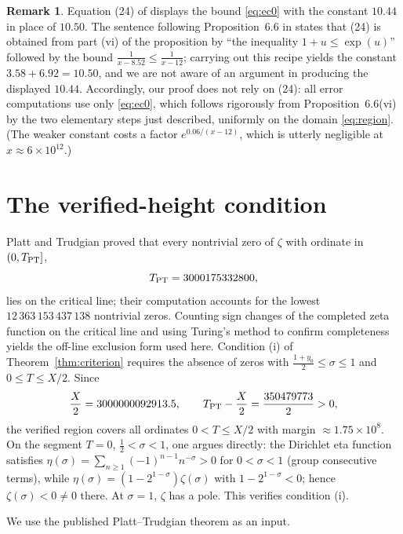 \documentclass[11pt]{article}
\theoremstyle{definition}
\newtheorem{remark}[theorem]{Remark}
\begin{document}
\begin{remark}\label{rem:1044}
Equation (24) of \cite{Polymath} displays the bound \eqref{eq:ec0}
with the constant $10.44$ in place of $10.50$. The sentence following
Proposition~6.6 in \cite{Polymath} states that (24) is obtained from
part (vi) of the proposition by ``the inequality $1+u\le\exp(u)$''
followed by the bound $\frac{1}{x-8.52}\le\frac{1}{x-12}$; carrying
out this recipe yields the constant $3.58+6.92=10.50$, and we are not
aware of an argument in \cite{Polymath} producing the displayed
$10.44$. Accordingly, our proof does not rely on (24): all error
computations use only
\eqref{eq:ec0}, which follows rigorously from Proposition~6.6(vi) by
the two elementary steps just described, uniformly on the domain
\eqref{eq:region}. (The weaker constant costs a factor
$e^{0.06/(x-12)}$, which is utterly negligible at
$x\approx6\times10^{12}$.)
\end{remark}

\section{The verified-height condition}\label{sec:hypi}

Platt and Trudgian \cite[Theorem~1]{PlattTrudgian} proved that every
nontrivial zero of $\zeta$ with ordinate in $(0,T_{\rm PT}]$,
\[
T_{\rm PT}=3000175332800,
\]
lies on the critical line; their computation accounts for the lowest
$12\,363\,153\,437\,138$ nontrivial zeros. Counting sign changes of the
completed zeta function on the critical line and using Turing's method to
confirm completeness yields the off-line exclusion form used here.
Condition (i) of
Theorem~\ref{thm:criterion} requires the absence of zeros with
$\frac{1+y_0}{2}\le\sigma\le1$ and $0\le T\le X/2$. Since
\[
\frac X2=3000000092913.5,
\qquad
T_{\rm PT}-\frac X2=\frac{350479773}{2}>0,
\]
the verified region covers all ordinates $0<T\le X/2$ with margin
$\approx1.75\times10^8$. On the segment $T=0$, $\tfrac12<\sigma<1$,
one argues directly: the Dirichlet eta function satisfies
$\eta(\sigma)=\sum_{n\ge1}(-1)^{n-1}n^{-\sigma}>0$ for
$0<\sigma<1$ (group consecutive terms), while
$\eta(\sigma)=(1-2^{1-\sigma})\zeta(\sigma)$ with
$1-2^{1-\sigma}<0$; hence $\zeta(\sigma)<0\ne0$ there. At $\sigma=1$,
$\zeta$ has a pole. This verifies condition (i).

We use the published Platt--Trudgian theorem as an input.
\end{document}
